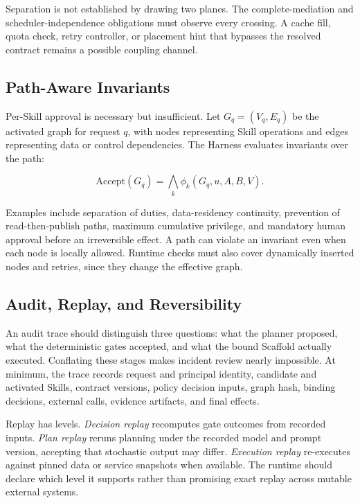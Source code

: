 \documentclass[11pt]{article}
\begin{document}
Separation is not established by drawing two planes. The complete-mediation and scheduler-independence obligations must observe every crossing. A cache fill, quota check, retry controller, or placement hint that bypasses the resolved contract remains a possible coupling channel.

\subsection{Path-Aware Invariants}

Per-Skill approval is necessary but insufficient. Let $G_q=(V_q,E_q)$ be the activated graph for request $q$, with nodes representing Skill operations and edges representing data or control dependencies. The Harness evaluates invariants over the path:

\begin{equation}
\mathrm{Accept}(G_q)=\bigwedge_k \phi_k(G_q,u,A,B,V).
\end{equation}

Examples include separation of duties, data-residency continuity, prevention of read-then-publish paths, maximum cumulative privilege, and mandatory human approval before an irreversible effect. A path can violate an invariant even when each node is locally allowed. Runtime checks must also cover dynamically inserted nodes and retries, since they change the effective graph.

\subsection{Audit, Replay, and Reversibility}

An audit trace should distinguish three questions: what the planner proposed, what the deterministic gates accepted, and what the bound Scaffold actually executed. Conflating these stages makes incident review nearly impossible. At minimum, the trace records request and principal identity, candidate and activated Skills, contract versions, policy decision inputs, graph hash, binding decisions, external calls, evidence artifacts, and final effects.

Replay has levels. \textit{Decision replay} recomputes gate outcomes from recorded inputs. \textit{Plan replay} reruns planning under the recorded model and prompt version, accepting that stochastic output may differ. \textit{Execution replay} re-executes against pinned data or service snapshots when available. The runtime should declare which level it supports rather than promising exact replay across mutable external systems.
\end{document}
